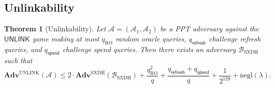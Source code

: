 \documentclass[11pt]{article}
\theoremstyle{definitionstyle}
\newtheorem{theorem}{Theorem}[section]
\theoremstyle{plain}
\newcommand{\advantage}[1]{\mathbf{Adv}^{\mathrm{#1}}}
\newcommand{\negl}{\mathrm{negl}}
\begin{document}
\subsection{Unlinkability}
\label{sec:unlinkability}

\begin{theorem}[Unlinkability]
\label{thm:unlinkability}
Let $\mathcal{A} = (\mathcal{A}_1, \mathcal{A}_2)$ be a PPT adversary against the $\mathsf{UNLINK}$ game making at most $q_{\text{RO}}$ random oracle queries, $q_{\mathsf{refresh}}$ challenge refresh queries, and $q_{\mathsf{spend}}$ challenge spend queries. Then there exists an adversary $\mathcal{B}_{\text{SXDH}}$ such that
\[
\advantage{UNLINK}(\mathcal{A}) \le 2 \cdot \advantage{SXDH}(\mathcal{B}_{\text{SXDH}}) + \frac{q_{\text{RO}}^2}{q} + \frac{q_{\mathsf{refresh}}+q_{\mathsf{spend}}}{q} + \frac{1}{2^{128}} + \negl(\lambda).
\]
\end{theorem}
\end{document}

